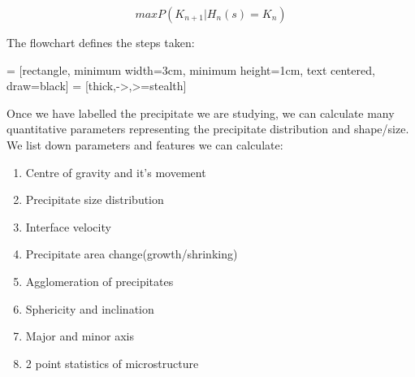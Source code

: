 \documentclass[12pt, a4paper]{report}
\begin{document}
\begin{equation}
    max{ }P(K_{n+1} | H_n(s) = K_n )
\end{equation}






The flowchart defines the steps taken:

\usetikzlibrary{shapes.geometric, arrows}
 = [rectangle, minimum width=3cm, minimum height=1cm, text centered, draw=black]
 = [thick,->,>=stealth]
\begin{center}
\end{center}


Once we have labelled the precipitate we are studying, we can calculate many quantitative parameters representing the precipitate distribution and shape/size. We list down parameters and features we can calculate:

\begin{enumerate}
    \item Centre of gravity and it's movement
    \item Precipitate size distribution
    \item Interface velocity
    \item Precipitate area change(growth/shrinking)
    \item Agglomeration of precipitates
    \item Sphericity and inclination
    \item Major and minor axis
    \item 2 point statistics of microstructure
\end{enumerate}
\end{document}
